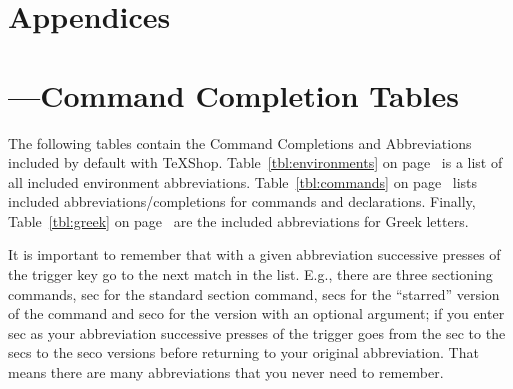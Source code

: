 \documentclass[letterpaper,11pt]{article}
\newcommand{\TS}{\textsf{\TeX Shop}}
\newcommand{\cmd}[1]{\textsf{#1}}
\begin{document}
\section*{Appendices}
\appendix



\section{---\quad Command Completion Tables}\label{sec:CCTables}
The following tables contain the Command Completions and Abbreviations included by default with \TS. Table~\ref{tbl:environments} on page~\pageref{tbl:environments} is a list of all included environment abbreviations. Table~\ref{tbl:commands} on page~\pageref{tbl:commands} lists included abbreviations/completions for commands and declarations. Finally, Table~\ref{tbl:greek} on page~\pageref{tbl:greek} are the included abbreviations for Greek letters.

It is important to remember that with a given abbreviation successive presses of the trigger key go to the next match in the list. E.g., there are three sectioning commands, \cmd{sec} for the standard section command, \cmd{secs} for the ``starred'' version of the command and \cmd{seco} for the version with an optional argument; if you enter \cmd{sec} as your abbreviation successive presses of the trigger goes from the \cmd{sec} to the \cmd{secs} to the \cmd{seco} versions before returning to your original abbreviation. That means there are many abbreviations that you never need to remember.
\end{document}
